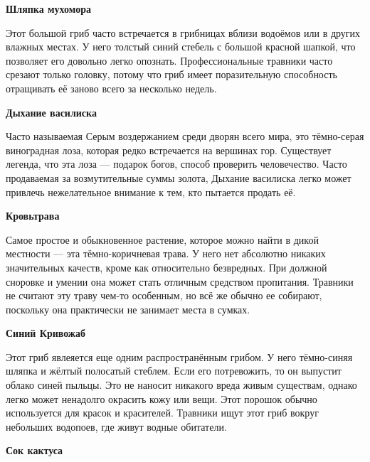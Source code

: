 \documentclass[a4paper, 9pt, twocolumn]{book}
\begin{document}
	\medspace
	
	\noindent \textbf{Шляпка мухомора}
	
	\smallskip
	
	\noindent Этот большой гриб часто встречается в грибницах вблизи водоёмов или в других влажных местах. У него толстый синий стебель с большой красной шапкой, что позволяет его довольно легко опознать. Профессиональные травники часто срезают только головку, потому что гриб имеет поразительную способность отращивать её заново всего за несколько недель.
	
	\medspace
	
	\noindent \textbf{Дыхание василиска}
	
	\smallskip
	
	\noindent Часто называемая Серым воздержанием среди дворян всего мира, это тёмно-серая виноградная лоза, которая редко встречается на вершинах гор. Существует легенда, что эта лоза --- подарок богов, способ проверить человечество. Часто продаваемая за возмутительные суммы золота, Дыхание василиска легко может привлечь нежелательное внимание к тем, кто пытается продать её.
	
	\medspace
	
	\noindent \textbf{Кровьтрава}
	
	\smallskip
	\noindent Самое простое и обыкновенное растение, которое можно найти в дикой местности --- эта тёмно-коричневая трава. У него нет абсолютно никаких значительных качеств, кроме как относительно безвредных. При должной сноровке и умении она может стать отличным средством пропитания. Травники не считают эту траву чем-то особенным, но всё же обычно ее собирают, поскольку она практически не занимает места в сумках.
	
	\medspace
	
	\noindent \textbf{Синий Кривожаб}
	
	\smallskip
	
	\noindent Этот гриб явлеяется еще одним распространённым грибом. У него тёмно-синяя шляпка и жёлтый полосатый стеблем. Если его потревожить, то он выпустит облако синей пыльцы. Это не наносит никакого вреда живым существам, однако легко может ненадолго окрасить кожу или вещи. Этот порошок обычно используется для красок и красителей. Травники ищут этот гриб вокруг небольших водопоев, где живут водные обитатели.
	
	\medspace
	
	\noindent \textbf{Сок кактуса}
	
	\smallskip 
	
\end{document}
